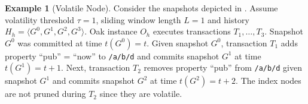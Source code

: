\documentclass[abstracton,12pt]{scrartcl}
\theoremstyle{definition}
\newtheorem{example}{Example}
\begin{document}
\begin{example}[Volatile Node]
  Consider the snapshots depicted in . Assume volatility
  threshold $\tau = 1$, sliding window length $L = 1$ and history $H_h
  = \langle G^0,G^1,G^2,G^3 \rangle$. Oak instance $O_h$ executes transactions
  $T_1, \dots , T_3$. Snapshot $G^0$ was committed at time $t(G^0) =
  t$. Given snapshot $G^0$, transaction $T_1$ adds property ``pub'' = ``now'' to
  \texttt{/a/b/d} and commits snapshot $G^1$ at time $t(G^1) = t + 1$. Next,
  transaction $T_2$ removes property ``pub'' from \texttt{/a/b/d} given snapshot
  $G^1$ and commits snapshot $G^2$ at time $t(G^2) = t + 2$. The index nodes are
  not pruned during $T_2$ since they are volatile.
  \label{ex:volatile_node}
\end{example}
\end{document}
